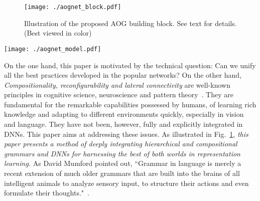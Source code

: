 \documentclass[10pt,twocolumn,letterpaper]{article}
\begin{document}
\begin{figure}
    	\centering
    	\texttt{[image: ./aognet\_block.pdf]}
    	\caption{\small{Illustration of the proposed AOG building block.
    	See text for details. (Best viewed in color)} 
    	}
    	\label{fig:AOG-block} 
\end{figure}

\begin{figure*}[t]
    	\centering
    	\texttt{[image: ./aognet\_model.pdf]}
    	\caption{\small{Illustration of an AOGNet which has 3 stages, 1 AOG building bock in the first and third stage, and 2 AOG building blocks in the second stage. Note that different stages can use different AND-OR graphs. We show the same one for simplicity. The front-end can be either a vanilla convolution or convolution+MaxPooling.  
    	(Best viewed in color) } \vspace{-2mm}
    	}
    	\label{fig:model} %
\end{figure*}

On the one hand, this paper is motivated by the technical question: Can we unify all the best practices developed in the popular networks? On the other hand, \textit{Compositionality, reconfigurability and lateral connectivity} are well-known principles in cognitive science, neuroscience and pattern theory~\cite{Geman_CompositionSystems,Mumford_PT,Grenander_PT,RCN,ProbabilisticProgramInduction,RCN}. They are fundamental for the remarkable capabilities possessed by humans, of learning rich knowledge and adapting to different environments quickly, especially in vision and language. They have not been, however, fully and explicitly integrated in DNNs. This paper aims at addressing these issues. As illustrated in Fig.~\ref{fig:AOG-block}, \textit{this paper presents a method of deeply integrating hierarchical and compositional grammars and DNNs for harnessing the best of both worlds in representation learning.}  As David Mumford pointed out, ``Grammar in language is merely a recent extension of much older grammars that are built into the brains of all intelligent animals to analyze sensory input, to structure their actions and even formulate their thoughts."~\cite{Mumford}.    
\end{document}
